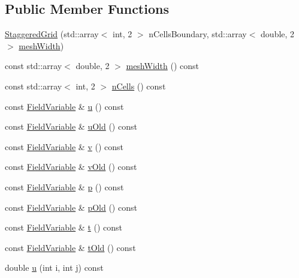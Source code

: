 \subsection*{Public Member Functions}
\begin{DoxyCompactItemize}
\item 
\mbox{\hyperlink{classStaggeredGrid_a2d170c6bbd8f7949ded93cdab769d18a}{Staggered\+Grid}} (std\+::array$<$ int, 2 $>$ n\+Cells\+Boundary, std\+::array$<$ double, 2 $>$ \mbox{\hyperlink{classStaggeredGrid_a330856d4efe952771daf0753ef84068e}{mesh\+Width}})
\item 
const std\+::array$<$ double, 2 $>$ \mbox{\hyperlink{classStaggeredGrid_a330856d4efe952771daf0753ef84068e}{mesh\+Width}} () const
\item 
const std\+::array$<$ int, 2 $>$ \mbox{\hyperlink{classStaggeredGrid_af37816ccb2c46e4a514dedac261897bf}{n\+Cells}} () const
\item 
const \mbox{\hyperlink{classFieldVariable}{Field\+Variable}} \& \mbox{\hyperlink{classStaggeredGrid_a87cee12621c641ab143a8b1a61b2ef7e}{u}} () const
\item 
const \mbox{\hyperlink{classFieldVariable}{Field\+Variable}} \& \mbox{\hyperlink{classStaggeredGrid_acab136fb25e040d8125c370290864ea5}{u\+Old}} () const
\item 
const \mbox{\hyperlink{classFieldVariable}{Field\+Variable}} \& \mbox{\hyperlink{classStaggeredGrid_a26e478abba632554652c9e05a279d1ca}{v}} () const
\item 
const \mbox{\hyperlink{classFieldVariable}{Field\+Variable}} \& \mbox{\hyperlink{classStaggeredGrid_a53df6ed75cf3021d50593a04c9d7f390}{v\+Old}} () const
\item 
const \mbox{\hyperlink{classFieldVariable}{Field\+Variable}} \& \mbox{\hyperlink{classStaggeredGrid_aafe6e0bb3509f6aad272b94f74e7ffec}{p}} () const
\item 
const \mbox{\hyperlink{classFieldVariable}{Field\+Variable}} \& \mbox{\hyperlink{classStaggeredGrid_ae2e215ba6d87dfc41beb42649ba1b799}{p\+Old}} () const
\item 
const \mbox{\hyperlink{classFieldVariable}{Field\+Variable}} \& \mbox{\hyperlink{classStaggeredGrid_a04ff9b2c14158e1f75860c8e4ef0a101}{t}} () const
\item 
const \mbox{\hyperlink{classFieldVariable}{Field\+Variable}} \& \mbox{\hyperlink{classStaggeredGrid_afd742febc872b98795e2a47835815685}{t\+Old}} () const
\item 
double \mbox{\hyperlink{classStaggeredGrid_a0324ce4d1fe2343d8aa9514e460cc556}{u}} (int i, int j) const

\end{DoxyCompactItemize}
